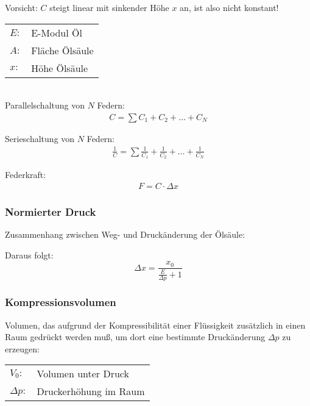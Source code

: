 Vorsicht: $C$ steigt linear mit sinkender Höhe $x$ an, ist also nicht konstant!

\begin{tabular}{ll}
$E:$ & E-Modul Öl \\
$A:$ & Fläche Ölsäule \\
$x:$ & Höhe Ölsäule
\end{tabular} \\


Parallelschaltung von $N$ Federn:
\begin{align*}
C = \sum C_1  + C_2 + \hdots + C_N
\end{align*}


Serieschaltung von $N$ Federn:
\begin{align*}
\frac{1}{C} = \sum \frac{1}{C_1} + \frac{1}{C_2} + \hdots + \frac{1}{C_N}
\end{align*}


Federkraft:
\begin{align*}
F = C \cdot \Delta x
\end{align*}




\subsubsection{Normierter Druck}
Zusammenhang zwischen Weg- und Druckänderung der Ölsäule:

Daraus folgt: 
$$\Delta x = \frac{x_0}{\frac{E}{\Delta p} + 1}$$

\subsubsection{Kompressionsvolumen}
Volumen, das aufgrund der Kompressibilität einer Flüssigkeit zusätzlich in einen Raum gedrückt werden muß, um dort eine bestimmte Druckänderung $\Delta p$ zu erzeugen:

\begin{tabular}{ll}
$V_0:$ & Volumen unter Druck \\
$\Delta p:$ &Druckerhöhung im Raum
\end{tabular}

